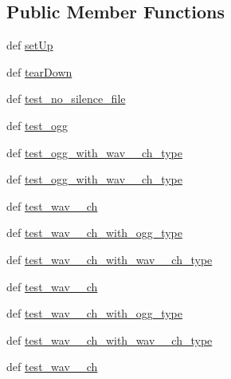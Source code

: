 \subsection*{Public Member Functions}
\begin{DoxyCompactItemize}
\item 
def \hyperlink{classset__noise__profile__unit__tests_1_1TestAudioProcessing_aa7eba721c2137e085d71fd1126929876}{set\-Up}
\item 
def \hyperlink{classset__noise__profile__unit__tests_1_1TestAudioProcessing_abfbcf658ea73b62d4b94016a778515f4}{tear\-Down}
\item 
def \hyperlink{classset__noise__profile__unit__tests_1_1TestAudioProcessing_a6293aff3a1f71fdcd51393ae57948a32}{test\-\_\-no\-\_\-silence\-\_\-file}
\item 
def \hyperlink{classset__noise__profile__unit__tests_1_1TestAudioProcessing_aae66bc9e72046243dd4a1cbd43a5dae5}{test\-\_\-ogg}
\item 
def \hyperlink{classset__noise__profile__unit__tests_1_1TestAudioProcessing_a9e4063805c8545ba621b7e09fba15c60}{test\-\_\-ogg\-\_\-with\-\_\-wav\-\_\-\_\-ch\-\_\-type}
\item 
def \hyperlink{classset__noise__profile__unit__tests_1_1TestAudioProcessing_a5f997de787a67b81ec5e33b8b2d23615}{test\-\_\-ogg\-\_\-with\-\_\-wav\-\_\-\_\-ch\-\_\-type}
\item 
def \hyperlink{classset__noise__profile__unit__tests_1_1TestAudioProcessing_a7b2dbff468be7478d9a1386a3bab6ac9}{test\-\_\-wav\-\_\-\_\-ch}
\item 
def \hyperlink{classset__noise__profile__unit__tests_1_1TestAudioProcessing_a72be9bf00b4fbe3248e71b8c17201f02}{test\-\_\-wav\-\_\-\_\-ch\-\_\-with\-\_\-ogg\-\_\-type}
\item 
def \hyperlink{classset__noise__profile__unit__tests_1_1TestAudioProcessing_a21bb7d6856ed95d70e3e6c5e3d7cd294}{test\-\_\-wav\-\_\-\_\-ch\-\_\-with\-\_\-wav\-\_\-\_\-ch\-\_\-type}
\item 
def \hyperlink{classset__noise__profile__unit__tests_1_1TestAudioProcessing_ae81e405165fb08eafcf2d24e524ba6d6}{test\-\_\-wav\-\_\-\_\-ch}
\item 
def \hyperlink{classset__noise__profile__unit__tests_1_1TestAudioProcessing_a7b76d128b1f1ff7e84bdbbed37deffe7}{test\-\_\-wav\-\_\-\_\-ch\-\_\-with\-\_\-ogg\-\_\-type}
\item 
def \hyperlink{classset__noise__profile__unit__tests_1_1TestAudioProcessing_a8fcca5d1c4f97bb316bbc10b252585d9}{test\-\_\-wav\-\_\-\_\-ch\-\_\-with\-\_\-wav\-\_\-\_\-ch\-\_\-type}
\item 
def \hyperlink{classset__noise__profile__unit__tests_1_1TestAudioProcessing_acd1924ca4d59275d8f8841fe43d79f67}{test\-\_\-wav\-\_\-\_\-ch}
\end{DoxyCompactItemize}
